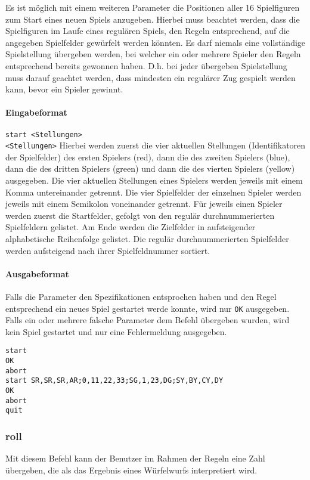 \documentclass[
  name=\assignment,
  start=\releasedate,
  end=\duedate,
  subject=\lecture\,--\,\semester,
  group=\group,
  url=\theurl,
  author=\authors,
  mail=\themail
]{assignment}
\newcommand{\code}[1]{\colorbox{codegray}{\texttt{#1}}}
\begin{document}
Es ist möglich mit einem weiteren Parameter die Positionen aller 16 Spielfiguren zum Start eines neuen Spiels anzugeben. Hierbei muss beachtet werden, dass die Spielfiguren im Laufe eines regulären Spiels, den Regeln entsprechend, auf die angegeben Spielfelder gewürfelt werden könnten. Es darf niemals eine vollständige Spielstellung übergeben werden, bei welcher ein oder mehrere Spieler den Regeln entsprechend bereits gewonnen haben. D.h. bei jeder übergeben Spielstellung muss darauf geachtet werden, dass mindesten ein regulärer Zug gespielt werden kann, bevor ein Spieler gewinnt.

\paragraph*{Eingabeformat}
\code{start <Stellungen>}\\
\texttt{<Stellungen>} Hierbei werden zuerst die vier aktuellen Stellungen (Identifikatoren der Spielfelder) des ersten Spielers (red), dann die des zweiten Spielers (blue), dann die des dritten Spielers (green) und dann die des vierten Spielers (yellow) ausgegeben. Die vier aktuellen Stellungen eines Spielers werden jeweils mit einem Komma untereinander getrennt. Die vier Spielfelder der einzelnen Spieler werden jeweils mit einem Semikolon voneinander getrennt. Für jeweils einen Spieler werden zuerst die Startfelder, gefolgt von den regulär durchnummerierten Spielfeldern gelistet. Am Ende werden die Zielfelder in aufsteigender alphabetische Reihenfolge gelistet. Die regulär durchnummerierten Spielfelder werden aufsteigend nach ihrer Spielfeldnummer sortiert.

\paragraph*{Ausgabeformat}
Falls die Parameter den Spezifikationen entsprochen haben und den Regel entsprechend ein neues Spiel gestartet werde konnte, wird nur \texttt{OK} ausgegeben. Falls ein oder mehrere falsche Parameter dem Befehl übergeben wurden, wird kein Spiel gestartet und nur eine Fehlermeldung ausgegeben.

\begin{tcolorbox}[title=Beispiel]
\begin{verbatim}
start
OK
abort
start SR,SR,SR,AR;0,11,22,33;SG,1,23,DG;SY,BY,CY,DY
OK
abort
quit
\end{verbatim}
\end{tcolorbox}


\subsubsection*{roll}
Mit diesem Befehl kann der Benutzer im Rahmen der Regeln eine Zahl übergeben, die als das Ergebnis eines Würfelwurfs interpretiert wird.
\end{document}
